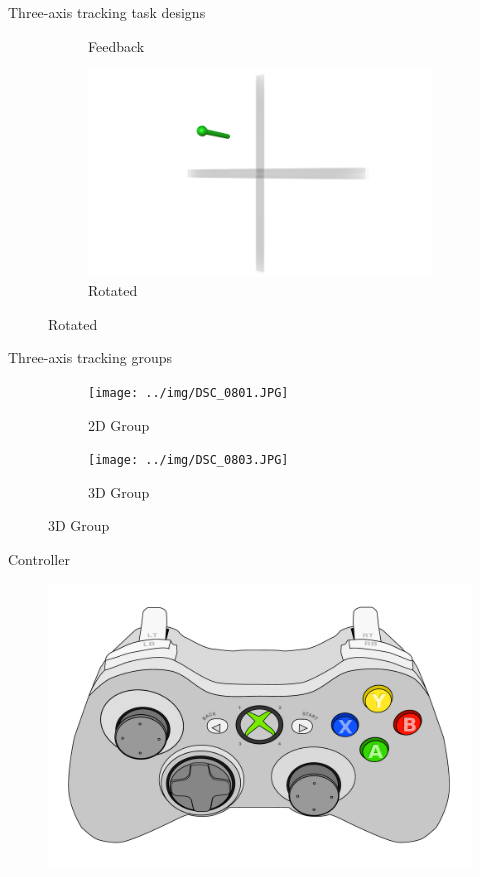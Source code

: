 \documentclass[10pt]{beamer}
\begin{document}
\begin{frame}[fragile]{Three-axis tracking task designs}
\begin{figure}
\begin{center}
\begin{subfigure}{0.45\linewidth}
        \caption{Feedback}
      \end{subfigure}\hfill
      \begin{subfigure}{0.45\linewidth}
        \includegraphics[width=\linewidth]{../img/Angled.png}
        \caption{Rotated}
      \end{subfigure}
    \end{center}
  \end{figure}
\end{frame}

\begin{frame}[fragile]{Three-axis tracking groups}
  \begin{figure}
    \begin{center}
      \begin{subfigure}{0.49\textwidth}
        \texttt{[image: ../img/DSC\_0801.JPG]}
        \caption{2D Group}
      \end{subfigure}\hfill
      \begin{subfigure}{0.49\textwidth}
        \texttt{[image: ../img/DSC\_0803.JPG]}
        \caption{3D Group}
      \end{subfigure}
    \end{center}
  \end{figure}
\end{frame}

\begin{frame}[fragile]{Controller}
  \begin{figure}[h!]
    \begin{center}
      \includegraphics[width=0.75\linewidth]{../img/Xbox_Controller.pdf}
    \end{center}
  \end{figure}
\end{frame}
\end{document}
